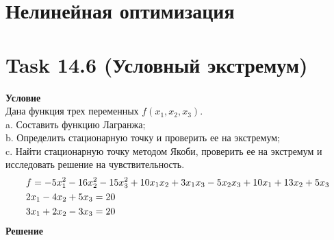 \documentclass[12pt]{article}
\begin{document}
\section*{Нелинейная оптимизация}

\section*{Task 14.6 (Условный экстремум)}
\textbf{Условие}\\
Дана функция трех переменных $f(x_1, x_2, x_3)$.\\
a. Составить функцию Лагранжа;\\
b. Определить стационарную точку и проверить ее на экстремум;\\
c. Найти стационарную точку методом Якоби, проверить ее на экстремум и
исследовать решение на чувствительность.
\begin{align}
  &f = -5x_1^2-16x_2^2-15x_3^2+10x_1x_2+3x_1x_3-5x_2x_3+10x_1+13x_2+5x_3\notag\\
  &2x_1-4x_2+5x_3=20\\
  &3x_1+2x_2-3x_3=20\notag
\end{align}
\textbf{Решение}
\end{document}
